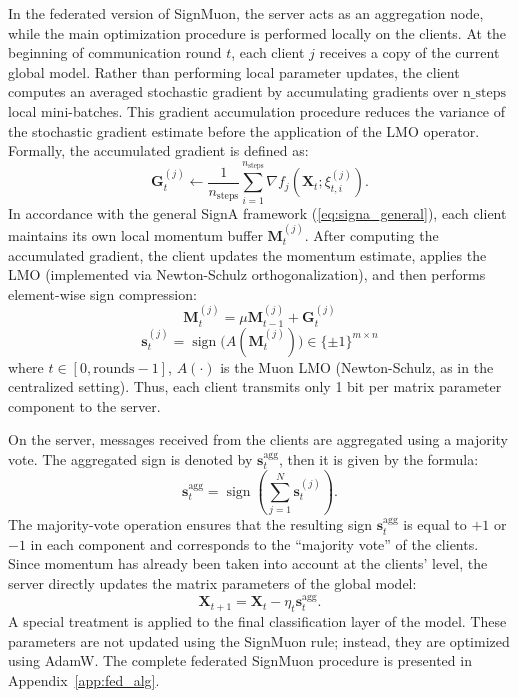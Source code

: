\documentclass{article}
\begin{document}
In the federated version of SignMuon, the server acts as an aggregation node, while the main optimization procedure is performed locally on the clients. At the beginning of communication round $t$, each client $j$ receives a copy of the current global model. Rather than performing local parameter updates, the client computes an averaged stochastic gradient by accumulating gradients over $\mathrm{n\_steps}$ local mini-batches. This gradient accumulation procedure reduces the variance of the stochastic gradient estimate before the application of the LMO operator. Formally, the accumulated gradient is defined as:
$$
\mathbf{G}_t^{(j)}\gets\frac{1}{n_{\text{steps}}}\sum_{i=1}^{n_{\text{steps}}}\nabla f_j(\mathbf{X}_t;\xi_{t,i}^{(j)}).
$$
In accordance with the general SignA framework (\ref{eq:signa_general}), each client maintains its own local momentum buffer $\mathbf{M}_t^{(j)}$. After computing the accumulated gradient, the client updates the momentum estimate, applies the LMO (implemented via Newton-Schulz orthogonalization), and then performs element-wise sign compression:
$$ \mathbf{M}_t^{(j)} = \mu \mathbf{M}_{t-1}^{(j)} + \mathbf{G}_t^{(j)} $$
$$ \mathbf{s}_t^{(j)} = \operatorname{sign}\bigl(A(\mathbf{M}_t^{(j)})\bigr) \in \{\pm 1\}^{m \times n} $$
where $t\in[0, \mathrm{rounds}-1]$, $A(\cdot)$ is the Muon LMO (Newton-Schulz, as in the centralized setting). Thus, each client transmits only 1 bit per matrix parameter component to the server.

On the server, messages received from the clients are aggregated using a majority vote. The aggregated sign is denoted by $\mathbf{s}_t^{\mathrm{agg}}$, then it is given by the formula:
\begin{equation}
\mathbf{s}_t^{\mathrm{agg}}=\operatorname{sign}\!\left(\sum_{j=1}^N \mathbf{s}_t^{(j)}\right).
\end{equation}
The majority-vote operation ensures that the resulting sign $\mathbf{s}_t^{\mathrm{agg}}$ is equal to $+1$ or $-1$ in each component and corresponds to the “majority vote” of the clients. Since momentum has already been taken into account at the clients' level, the server directly updates the matrix parameters of the global model:
\[
\mathbf{X}_{t+1} = \mathbf{X}_t - \eta_t \mathbf{s}_t^{\mathrm{agg}}.
\]
A special treatment is applied to the final classification layer of the model. These parameters are not updated using the SignMuon rule; instead, they are optimized using AdamW. The complete federated SignMuon procedure is presented in Appendix~\ref{app:fed_alg}.
\end{document}
